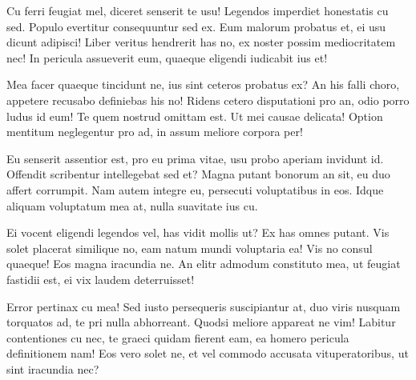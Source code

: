 \documentclass[
	12pt,				%
	openright,			%
	oneside,			%
	a4paper,			%
	english,			%
	french,				%
	spanish,			%
	brazil,				%
	]{abntex2}
\begin{document}
Cu ferri feugiat mel, diceret senserit te usu! Legendos imperdiet honestatis cu sed. Populo evertitur consequuntur sed ex. Eum malorum probatus et, ei usu dicunt adipisci! Liber veritus hendrerit has no, ex noster possim mediocritatem nec! In pericula assueverit eum, quaeque eligendi iudicabit ius et!

Mea facer quaeque tincidunt ne, ius sint ceteros probatus ex? An his falli choro, appetere recusabo definiebas his no! Ridens cetero disputationi pro an, odio porro ludus id eum! Te quem nostrud omittam est. Ut mei causae delicata! Option mentitum neglegentur pro ad, in assum meliore corpora per!

Eu senserit assentior est, pro eu prima vitae, usu probo aperiam invidunt id. Offendit scribentur intellegebat sed et? Magna putant bonorum an sit, eu duo affert corrumpit. Nam autem integre eu, persecuti voluptatibus in eos. Idque aliquam voluptatum mea at, nulla suavitate ius cu.

Ei vocent eligendi legendos vel, has vidit mollis ut? Ex has omnes putant. Vis solet placerat similique no, eam natum mundi voluptaria ea! Vis no consul quaeque! Eos magna iracundia ne. An elitr admodum constituto mea, ut feugiat fastidii est, ei vix laudem deterruisset!

Error pertinax cu mea! Sed iusto persequeris suscipiantur at, duo viris nusquam torquatos ad, te pri nulla abhorreant. Quodsi meliore appareat ne vim! Labitur contentiones cu nec, te graeci quidam fierent eam, ea homero pericula definitionem nam! Eos vero solet ne, et vel commodo accusata vituperatoribus, ut sint iracundia nec?
\end{document}
